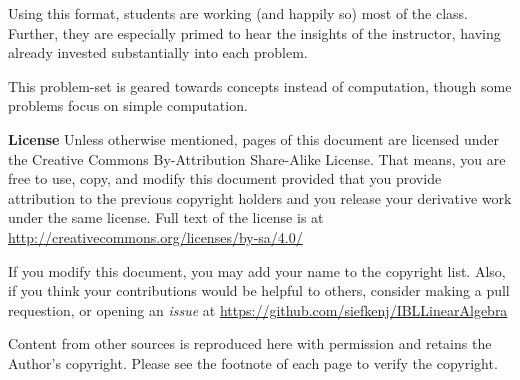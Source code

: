 \documentclass{problemset}
\begin{document}
Using this format, students are working (and happily so) most of the class. Further,
they are especially primed to hear the insights of the instructor, having already
invested substantially into each problem.

This problem-set is geared towards concepts instead of computation, though some problems
focus on simple computation.

{\bf License} Unless otherwise mentioned, pages of this document are licensed under
the Creative Commons By-Attribution Share-Alike License. That means, you are free
to use, copy, and modify this document provided that you provide attribution to the
previous copyright holders and you release your derivative work under the same license.
Full text of the license is at \url{http://creativecommons.org/licenses/by-sa/4.0/}

If you modify this document, you may add your name to the copyright list. Also,
if you think your contributions would be helpful to others, consider making a
pull requestion, or opening an \emph{issue} at \url{https://github.com/siefkenj/IBLLinearAlgebra}

Content from other sources is reproduced here with permission and retains the
Author's copyright. Please see the footnote of each page to verify the
copyright.

\newpage
\pagestyle{siefken}


\end{document}
